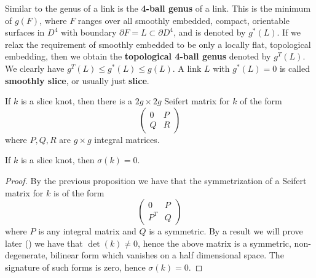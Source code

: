 Similar to the genus of a link is the \textbf{4-ball genus} of a link. This is the minimum of $g(F)$, where $F$ ranges over all smoothly embedded, compact, orientable surfaces in $D^4$ with boundary $\partial F = L \subset \partial D^4$, and is denoted by $g^*(L)$. If we relax the requirement of smoothly embedded to be only a locally flat, topological embedding, then we obtain the \textbf{topological 4-ball genus} denoted by $g^T(L)$. We clearly have $g^T(L) \leq g^*(L) \leq g(L)$. A link $L$ with $g^*(L)=0$ is called \textbf{smoothly slice}, or usually just \textbf{slice}.

\begin{prop}
If $k$ is a slice knot, then there is a $2g \times 2g$ Seifert matrix for $k$ of the form
\[ \begin{pmatrix} 0 & P \\ Q & R \end{pmatrix} \]
where $P,Q,R$ are $g \times g$ integral matrices.
\end{prop}

\begin{cor}
If $k$ is a slice knot, then $\sigma(k) = 0$.
\end{cor}
\begin{proof}
By the previous proposition we have that the symmetrization of a Seifert matrix for $k$ is of the form
\[ \begin{pmatrix} 0 & P \\ P^T & Q \end{pmatrix} \]
where $P$ is any integral matrix and $Q$ is a symmetric. By a result we will prove later () we have that $\det(k) \neq 0$, hence the above matrix is a symmetric, non-degenerate, bilinear form which vanishes on a half dimensional space. The signature of such forms is zero, hence $\sigma(k)=0$.
\end{proof}

